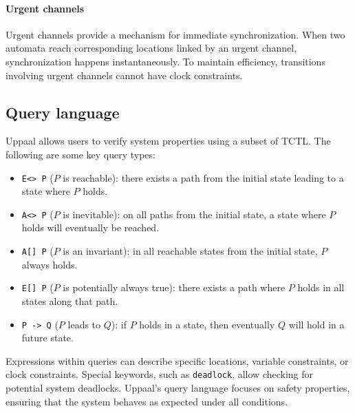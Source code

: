 \paragraph*{Urgent channels}
Urgent channels provide a mechanism for immediate synchronization. 
When two automata reach corresponding locations linked by an urgent channel, synchronization happens instantaneously. 
To maintain efficiency, transitions involving urgent channels cannot have clock constraints.

\subsection{Query language}
Uppaal allows users to verify system properties using a subset of TCTL. 
The following are some key query types:
\begin{itemize}
    \item \texttt{E<> P} ($P$ is reachable): there exists a path from the initial state leading to a state where $P$ holds.
    \item \texttt{A<> P} ($P$ is inevitable): on all paths from the initial state, a state where $P$ holds will eventually be reached.
    \item \texttt{A[] P} ($P$ is an invariant): in all reachable states from the initial state, $P$ always holds.
    \item \texttt{E[] P} ($P$ is potentially always true): there exists a path where $P$ holds in all states along that path.
    \item \texttt{P -> Q} ($P$ leads to $Q$): if $P$ holds in a state, then eventually $Q$ will hold in a future state. 
\end{itemize}
\noindent Expressions within queries can describe specific locations, variable constraints, or clock constraints. 
Special keywords, such as \texttt{deadlock}, allow checking for potential system deadlocks.
Uppaal's query language focuses on safety properties, ensuring that the system behaves as expected under all conditions.
